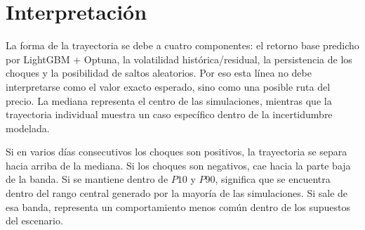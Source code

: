 \documentclass[12pt,letterpaper]{article}
\begin{document}
\section{Interpretación}
La forma de la trayectoria se debe a cuatro componentes: el retorno base predicho por LightGBM + Optuna, la volatilidad histórica/residual, la persistencia de los choques y la posibilidad de saltos aleatorios. Por eso esta línea no debe interpretarse como el valor exacto esperado, sino como una posible ruta del precio. La mediana representa el centro de las simulaciones, mientras que la trayectoria individual muestra un caso específico dentro de la incertidumbre modelada.

Si en varios días consecutivos los choques son positivos, la trayectoria se separa hacia arriba de la mediana. Si los choques son negativos, cae hacia la parte baja de la banda. Si se mantiene dentro de $P10$ y $P90$, significa que se encuentra dentro del rango central generado por la mayoría de las simulaciones. Si sale de esa banda, representa un comportamiento menos común dentro de los supuestos del escenario.
\end{document}
